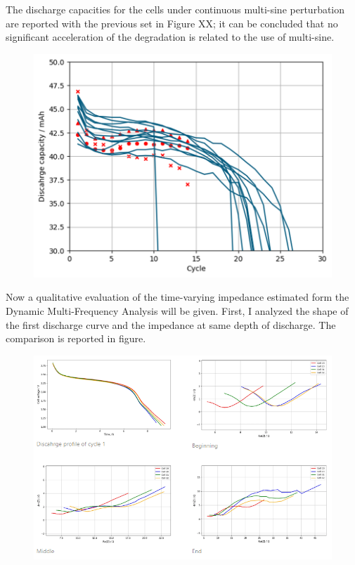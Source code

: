 The discharge capacities for the cells under continuous multi-sine perturbation are reported with the previous set in Figure XX; it can be concluded that no significant acceleration of the degradation is related to the use of multi-sine.

\begin{figure}
    \centering
    \includegraphics[width=0.8\linewidth]{figures/application4/image3.png}
\end{figure}

Now a qualitative evaluation of the time-varying impedance estimated form the Dynamic Multi-Frequency Analysis will be given. First, I analyzed the shape of the first discharge curve and the impedance at same depth of discharge. The comparison is reported in figure.

\begin{figure}
    \centering
    \includegraphics[width=\linewidth]{figures/application4/image4.PNG}
\end{figure}

